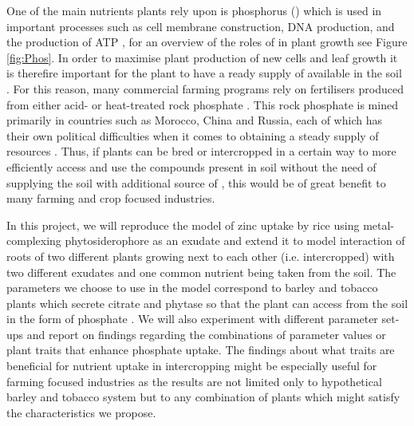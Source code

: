 \documentclass[11pt]{article}
\numberwithin{equation}{section}
\begin{document}
One of the main nutrients plants rely upon is phosphorus () which is used in important processes such as cell membrane construction, DNA production, and the production of ATP \cite{vysotskaya_2016}, for an overview of the roles of  in plant growth see Figure \ref{fig:Phos}. In order to maximise plant production of new cells and leaf growth it is therefire important for the plant to have a ready supply of  available in the soil \cite{vysotskaya_2016}. For this reason, many commercial farming programs rely on  fertilisers produced from either acid- or heat-treated rock phosphate \cite{PhosporusRecoveryandRecycling}. This rock phosphate is mined primarily in countries such as Morocco, China and Russia, each of which has their own political difficulties when it comes to obtaining a steady supply of resources \cite{fact.mr_2021}. Thus, if plants can be bred or intercropped in a certain way to more efficiently access and use the  compounds present in soil without the need of supplying the soil with additional source of , this would be of great benefit to many farming and crop focused industries.

In this project, we will reproduce the model of zinc uptake by rice using metal-complexing phytosidero\-phore as an exudate \cite{Ptashnyk-2011} and extend it to model interaction of roots of two different plants growing next to each other (i.e. intercropped) with two different exudates and one common nutrient being taken from the soil. The parameters we choose to use in the model correspond to barley and tobacco plants which secrete citrate and phytase so that the plant can access  from the soil in the form of phosphate \cite{giles_richardson2018}. We will also experiment with different parameter set-ups and report on findings regarding the combinations of parameter values or plant traits that enhance phosphate uptake. The findings about what traits are beneficial for nutrient uptake in intercropping might be especially useful for farming focused industries as the results are not limited only to hypothetical barley and tobacco system but to any combination of plants which might satisfy the characteristics we propose. 
\end{document}
